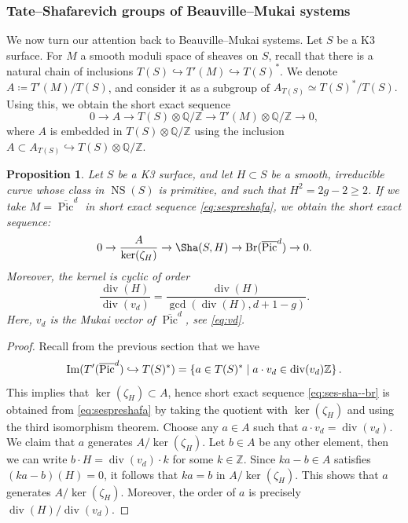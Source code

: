 \documentclass[11pt,twoside]{amsart}
\numberwithin{equation}{section}
\newtheorem{proposition}[dummy]{Proposition}
\theoremstyle{definition}
\theoremstyle{plain}
\newcommand{\Z}{\ensuremath{\mathbb{Z}}}
\newcommand{\Q}{\ensuremath{\mathbb{Q}}}
\def\NS{\operatorname{NS}}
\def\olPic{\overline{\operatorname{Pic}}}
\def\Br{\operatorname{Br}}
\def\dv{\operatorname{div}}
\begin{document}
\subsubsection{Tate--Shafarevich groups of Beauville--Mukai systems}
We now turn our attention back to Beauville--Mukai systems. Let $S$ be a K3 surface.
For $M$ a smooth moduli space of sheaves on $S$, recall that there is a natural chain of inclusions $T(S)\hookrightarrow T'(M)\hookrightarrow T(S)^*.$ We denote $A\coloneqq T'(M)/T(S)$, and consider it as a subgroup of $A_{T(S)} \simeq T(S)^*/T(S).$ Using this, we obtain the short exact sequence
\begin{equation}\label{eq:sespreshafa}
    0\to A\to T(S)\otimes \Q/\Z\to T'(M)\otimes \Q/\Z\to 0,
\end{equation}
where $A$ is embedded in $T(S)\otimes \Q/\Z$ using the inclusion $A\subset A_{T(S)}\hookrightarrow T(S)\otimes \Q/\Z$.  
\begin{proposition}\label{prop:sesshafabrauer}
    Let $S$ be a K3 surface, and let $H\subset S$ be a smooth, irreducible curve whose class in $\NS(S)$ is primitive, and such that $H^2 = 2g-2\geq 2$. If we take $M = \olPic^d$ in short exact sequence \eqref{eq:sespreshafa}, we obtain the short exact sequence:
   \begin{equation}\label{eq:ses-sha--br}
        0\to \frac{A}{\ker(\zeta_H)}\to \Sha(S,H) \to \Br(\olPic^d)\to 0.
    \end{equation} 
    Moreover, the kernel is cyclic of order $$\frac{\dv(H)}{\dv(v_d)} = \frac{\dv(H)}{\gcd(\dv(H),d+1-g)}.$$ Here, $v_d$ is the Mukai vector of $\olPic^d$, see \eqref{eq:vd}.
\end{proposition}
\begin{proof}
    Recall from the previous section that we have $$\im(T'(\olPic^d)\hookrightarrow T(S)^*) = \left\{a\in T(S)^*\mid a\cdot v_d\in \dv(v_d)\Z\right\}.$$ 
    This implies that $\ker(\zeta_H)\subset A$, hence short exact sequence \eqref{eq:ses-sha--br} is obtained from \eqref{eq:sespreshafa} by taking the quotient with $\ker(\zeta_H)$ and using the third isomorphism theorem. 
    Choose any $a\in A$ such that $a\cdot v_d = \dv(v_d)$. We claim that $a$ generates $A/\ker(\zeta_H)$. Let $b\in A$ be any other element, then we can write $b\cdot H = \dv(v_d)\cdot k$ for some $k\in \Z$. Since $ka-b\in A$ satisfies $(ka-b)(H) = 0$, it follows that $ka = b$ in $A/\ker(\zeta_H)$. This shows that $a$ generates $A/\ker(\zeta_H)$. Moreover, the order of $a$ is precisely $\dv(H)/\dv(v_d)$. 
\end{proof}
\end{document}
